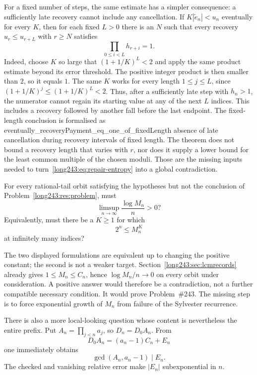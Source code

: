 \documentclass[11pt]{article}
\begin{document}
For a fixed number of steps, the same estimate has a simpler consequence:
a sufficiently late recovery cannot include any cancellation.  If
$K|\tilde e_n|<u_n$ eventually for every $K$, then for each fixed $L>0$ there is an
$N$ such that every recovery $u_r\le u_{r+L}$ with $r\ge N$ satisfies
\[
 \prod_{0\le i<L}h_{r+i}=1.
\]
Indeed, choose $K$ so large that $(1+1/K)^L<2$ and apply the same
product estimate beyond its error threshold. The positive integer
product is then smaller than $2$, so it equals $1$.
The same $K$ works for every length $1\le j\le L$, since
$(1+1/K)^j\le(1+1/K)^L<2$. Thus, after a sufficiently late step with
$h_n>1$, the numerator cannot regain its starting value at any of the
next $L$ indices. This includes a recovery followed by another fall
before the last endpoint. The fixed-length conclusion is formalised as
      {eventually_recoveryPayment_eq_one_of_fixedLength}
      {absence of late cancellation during recovery intervals of fixed length}.
The theorem does not bound a recovery length that varies with $r$, nor does it
supply a lower bound for the least common multiple of the chosen moduli.
Those are the missing inputs needed to turn~\eqref{long243:eq:repair-entropy} into a
global contradiction.

\begin{problem}\label{long243:res:lcmheight}
For every rational-tail orbit satisfying the hypotheses but not the conclusion of Problem~\ref{long243:res:problem},
must
\[
 \limsup_{n\to\infty}\frac{\log M_n}{n}>0?
\]
Equivalently, must there be a $K\ge1$ for which
\[
 2^n\le M_n^K
\]
at infinitely many indices?
\end{problem}

The two displayed formulations are equivalent up to changing the
positive constant; the second is not a weaker target.
Section~\ref{long243:sec:lcmrecords} already gives
$1\le M_n\le C_n$, hence $\log M_n/n\to0$ on every orbit under
consideration. A positive answer would therefore be a contradiction,
not a further compatible necessary condition. It would prove
Problem~\#243. The missing step is to force exponential growth of $M_n$
from failure of the Sylvester recurrence.

There is also a more local-looking question whose content is nevertheless the
entire prefix.  Put $A_n=\prod_{j<n}a_j$, so $D_n=D_0A_n$.  From
\[
 D_0A_n=(a_n-1)C_n+E_n
\]
one immediately obtains
\[
 \gcd(A_n,a_n-1)\mid E_n.
\]
The checked
and vanishing relative error make $|E_n|$ subexponential in $n$.
\end{document}
